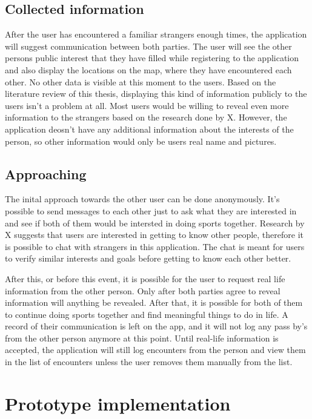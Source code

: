 \subsection{Collected information}

After the user has encountered a familiar strangers enough times, the application will suggest communication between both parties. The user will see the other persons public interest that they have filled while registering to the application and also display the locations on the map, where they have encountered each other. No other data is visible at this moment to the users. Based on the literature review of this thesis, displaying this kind of information publicly to the users isn't a problem at all. Most users would be willing to reveal even more information to the strangers based on the research done by X. However, the application deosn't have any additional information about the  interests of the person, so other information would only be users real name and pictures.

\subsection{Approaching}

The inital approach towards the other user can be done anonymously. It's possible to send messages to each other just to ask what they are interested in and see if both of them would be intersted in doing sports together. Research by X suggests that users are interested in getting to know other people, therefore it is possible to chat with strangers in this application. The chat is meant for users to verify similar interests and goals before getting to know each other better.

After this, or before this event, it is possible for the user to request real life information from the other person. Only after both parties agree to reveal information will anything be revealed. After that, it is possible for both of them to continue doing sports together and find meaningful things to do in life. A record of their communication is left on the app, and it will not log any pass by's from the other person anymore at this point. Until real-life information is accepted, the application will still log encounters from the person and view them in the list of encounters unless the user removes them manually from the list.

\section{Prototype implementation}

